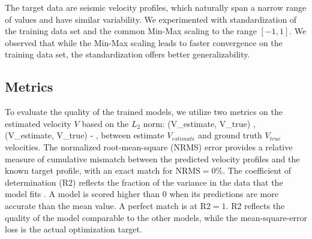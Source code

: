 \documentclass[paper,twocolomn]{geophysics}
\begin{document}
The target data are seismic velocity profiles, which naturally span a narrow range of values and have similar variability. We experimented with standardization of the training data set and the common Min-Max scaling to the range $[-1, 1]$. We observed that while the Min-Max scaling leads to faster convergence on the training data set, the standardization offers better generalizability.


\subsection{Metrics}
To evaluate the quality of the trained models, we utilize two metrics on the estimated velocity $V$ based on the $L_2$ norm:
\beq
{}(V_{estimate}, V_{true}) \equiv {},~\\
(V_{estimate}, V_{true})  - ,
\eeq
between estimate $V_{estimate}$ and ground truth $V_{true}$ velocities.
The normalized root-mean-square (NRMS) error provides a relative measure of cumulative mismatch between the predicted velocity profiles and the known target profile, with an exact match for $\text{NRMS} = 0\%$. The coefficient of determination (R2) reflects the fraction of the variance in the data that the model fits \citep{polo2018, kazei2020deep}. A model is scored higher than $0$ when its predictions are more accurate than the mean value. A perfect match is at $\text{R2} = 1$. R2 reflects the quality of the model comparable to the other models, while the mean-square-error loss is the actual optimization target.



%
\end{document}
